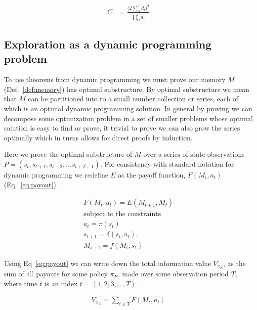 \documentclass[9pt,twocolumn,twoside]{pnas-new}
\begin{document}
\begin{equation} \label{eq:compactcude}
\begin{split}
    C & = \frac{\Big ( 2 \sum_{O}^{i} d_i \Big )^2}{\prod_{O}^{i} d_i}
\end{split}
\end{equation}

\subsection*{Exploration as a dynamic programming problem}
To use theorems from dynamic programming \cite{Bellman,Sutton2018a} we must prove our memory $M$ (Def.~\ref{def:memory}) has optimal substructure. By optimal substructure we mean that $M$ can be partitioned into to a small number collection or series, each of which is an optimal dynamic programming solution. In general by proving we can decompose some optimization problem in a set of smaller problems whose optimal solution is easy to find or prove, it trivial to prove we can also grow the series optimally which in turns allows for direct proofs by induction.

Here we prove the optimal substructure of $M$ over a series of state observations $P = (s_t, s_{t+1}, s_{t+2}, ... s_{t+T-1})$. For consistency with standard notation for dynamic programming we redefine $E$ as the payoff function, $F(M_{t}, a_t)$ (Eq.~\ref{eq:payout}). 

\begin{equation}
    \begin{split} \label{eq:payout}
    F(M_{t}, a_t) = E(M_{t+1}, M_{t})\\
    \text{subject to the constraints} \\
    a_{t} = \pi(s_t) \\
    s_{t+1} = \delta(s_{t}, a_t),\\ 
    M_{t+1} = f(M_{t}, s_{t})
    \end{split} 
\end{equation}

Using Eq~\ref{eq:payout} we can write down the total information value $V_{\pi_E}$, as the sum of all payouts for some policy $\pi_E$, made over some observation period $T$, where time $t$ is an index $t = (1,2,3,\ldots,T)$. 

\begin{equation} \label{eq:V}
    \begin{split}
        V_{\pi_E} = \sum_{t \in T} F(M_{t}, a_t)\\
    \end{split}
\end{equation}
\end{document}
